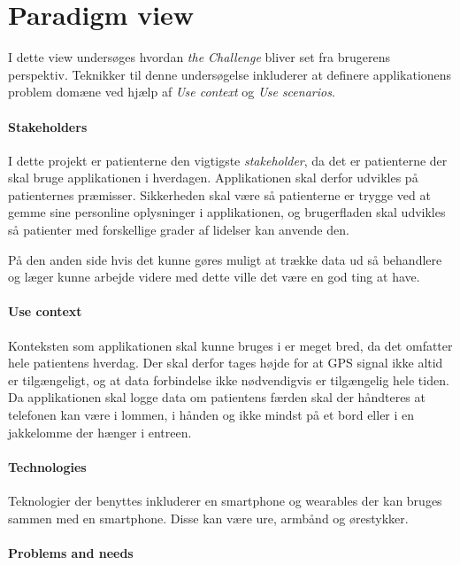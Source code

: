 

\section{Paradigm view}
I dette view undersøges hvordan \textit{the Challenge} bliver set fra brugerens perspektiv.
Teknikker til denne undersøgelse inkluderer at definere applikationens problem domæne ved hjælp af \textit{Use context} og \textit{Use scenarios}.

\paragraph{Stakeholders}
I dette projekt er patienterne den vigtigste \textit{stakeholder}, da det er patienterne der skal bruge applikationen i hverdagen.
Applikationen skal derfor udvikles på patienternes præmisser.
Sikkerheden skal være så patienterne er trygge ved at gemme sine personline oplysninger i applikationen, og brugerfladen skal udvikles så patienter med forskellige grader af lidelser kan anvende den.

På den anden side hvis det kunne gøres muligt at trække data ud så behandlere og læger kunne arbejde videre med dette ville det være en god ting at have.

\paragraph{Use context}
Konteksten som applikationen skal kunne bruges i er meget bred, da det omfatter hele patientens hverdag.
Der skal derfor tages højde for at GPS signal ikke altid er tilgængeligt, og at data forbindelse ikke nødvendigvis er tilgængelig hele tiden.
Da applikationen skal logge data om patientens færden skal der håndteres at telefonen kan være i lommen, i hånden og ikke mindst på et bord eller i en jakkelomme der hænger i entreen.

\paragraph{Technologies}
Teknologier der benyttes inkluderer en smartphone og wearables der kan bruges sammen med en smartphone.
Disse kan være ure, armbånd og ørestykker.

\paragraph{Problems and needs}

